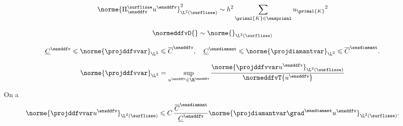 \begin{prop}
\[
\norme{\Pi^\surflisse_\ensddfv u^\ensddfv}^2_{\L^2(\surflisse)} \sim h^2 \sum_{\primal{K} \in \ensprimal} u_{\primal{K}}{}^2
\]
\end{prop}

\begin{prop}
\[
\normeddfvD{} \sim \norme{}_{\L^2(\surflisse)}   
\]
\end{prop}

\begin{prop}
\begin{equation}
\underline{C}^\ensddfv \leqslant \norme{\projddfvvar}_{\L^2} \leqslant \overline{C}^\ensddfv,
\quad
\underline{C}^\ensdiamant \leqslant \norme{\projdiamantvar}_{\L^2} \leqslant \overline{C}^\ensdiamant.
\end{equation}
\end{prop}

\begin{demo}
\[
\norme{\projddfvvar}_{\L^2} = \sup_{u^\ensddfv \in \R^\ensddfv} \frac{\norme{\projddfvvar u^\ensddfv}_{\L^2(\surflisse)}}{\normeddfvT{u^\ensddfv}}
\]
\end{demo}

\begin{corol}
On a
\[
\norme{\projddfvvar u^\ensddfv}_{\L^2(\surflisse)} \leqslant C \, \frac{\overline{C}^\ensdiamant}{\underline{C}^\ensddfv} \norme{\projdiamantvar \grad^\ensdiamant u^\ensddfv}_{\L^2(\surflisse)}.
\]
\end{corol}


